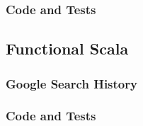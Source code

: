 \documentclass[letterpaper, 10pt, DIV=13]{scrartcl}
\numberwithin{equation}{section}
\numberwithin{figure}{section}
\numberwithin{table}{section}
\begin{document}
\subsubsection{Code and Tests}



\subsection{Functional Scala}

\subsubsection{Google Search History}

\subsubsection{Code and Tests}
\end{document}
